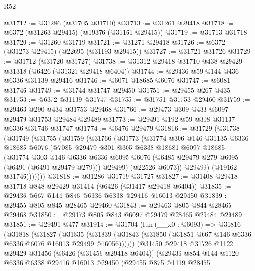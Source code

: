 \begin{lexlean}{R52}
\begin{coremodule}
@31712 := @31286 (@31705 @31710)
@31713 := @31261 @29418
@31718 := @6372 (@31263 @29415) (@19376 (@31161 @29415))
@31719 := @31713 @31718
@31720 := @31260 @31719
@31721 := @31271 @29418
@31726 := @6372 (@31273 @29415) (@22695 (@31193 @29415))
@31727 := @31721 @31726
@31729 := @31712 (@31720 @31727)
@31738 := @31312 @29418 @31710 @438 @29429 @31318 (@6426 (@31321 @29418 @6404))
@31744 := @29436 @59 @144 @436 @6336 @31139 @29416
@31746 := @6071 @18685 @6076
@31747 := @6081 @31746
@31749 := @31744 @31747 @29450
@31751 := @29455 @267 @435
@31753 := @6372 @31139 @31747
@31755 := @31751 @31753 @29460
@31759 := @29463 @290 @434 @31753 @29468
@31766 := @29473 @309 @433 @6097 @29479 @31753 @29484 @29489
@31773 := @29491 @192 @59 @308 @31137 @6336 @31746 @31747
@31774 := @6476 @29479
@31816 := @31729
    (@31738
      (@31749
        (@31755
          (@31759
            (@31766
              (@31773
                (@31774
                  @306
                  @146
                  @31135
                  @6336
                  @18685
                  @6076
                  (@7085
                    @29479
                    @301
                    @305
                    @6338
                    @18681
                    @6097
                    @18685
                    (@31774
                      @303
                      @146
                      @6336
                      @6336
                      @6095
                      @6076
                      (@6485 @29479 @279 @6095 (@6490 (@6491 @29479 @279)))
                      @29499)
                    (@22526 @6073))
                  @29499)
                (@19162 @31746)))))))
@31818 := @31286 @31719 @31727
@31827 := @31408 @29418 @31718 @848 @29429 @31414 (@6426 (@31417 @29418 @6404))
@31835 := @29436 @667 @144 @846 @6336 @6338 @29416 @16013 @29450
@31839 := @29455 @805 @845 @28465 @29460
@31843 := @29463 @805 @844 @28465 @29468
@31850 := @29473 @805 @843 @6097 @29479 @28465 @29484 @29489
@31851 := @29491 @477
@31914 := @31704
    (fun (__x0 : @6093) =>
    @31816
      (@31818
        (@31827
          (@31835
            (@31839 (@31843 (@31850 (@31851 @667 @146 @6336 @6336 @6076 @16013 @29499 @16056))))))
        (@31450
          @29418
          @31726
          @1122
          @29429
          @31456
          (@6426 (@31459 @29418 @6404))
          (@29436
            @854
            @144
            @1120
            @6336
            @6338
            @29416
            @16013
            @29450
            (@29455
              @875
              @1119
              @28465

\end{coremodule}
\end{lexlean}
